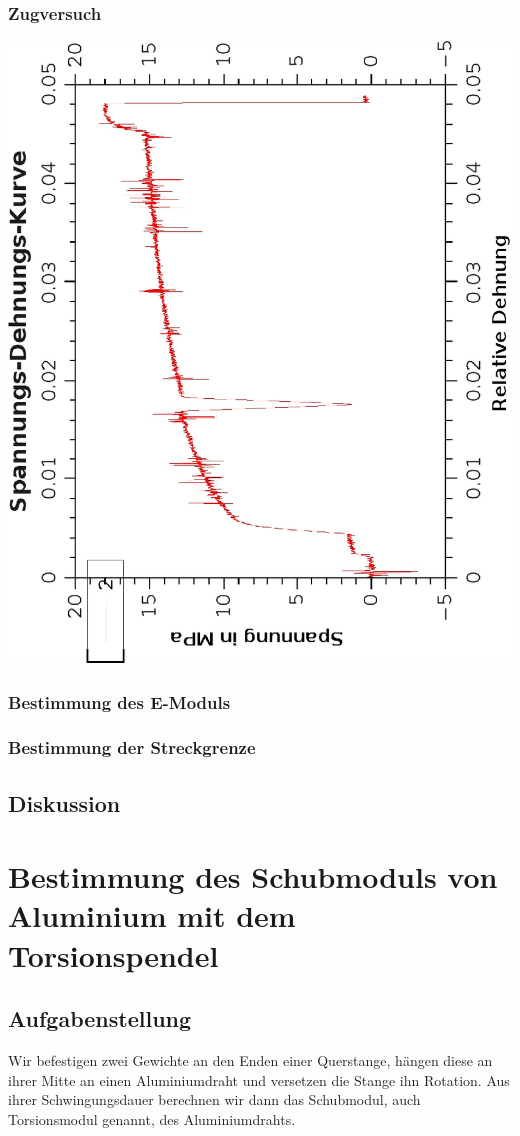 \documentclass{article}
\begin{document}
\subsubsection*{Zugversuch}
\includegraphics[scale=0.7,angle=-90]{spannungsdehnungskurve.eps}
\subsubsection*{Bestimmung des E-Moduls}
\subsubsection*{Bestimmung der Streckgrenze}
\subsection{Diskussion}
\section{Bestimmung des Schubmoduls von Aluminium mit dem Torsionspendel}
\subsection{Aufgabenstellung}
Wir befestigen zwei Gewichte an den Enden einer Querstange, hängen diese an ihrer Mitte an einen Aluminiumdraht und versetzen die Stange ihn Rotation. Aus ihrer Schwingungsdauer berechnen wir dann das Schubmodul, auch Torsionsmodul genannt, des Aluminiumdrahts.
\end{document}

